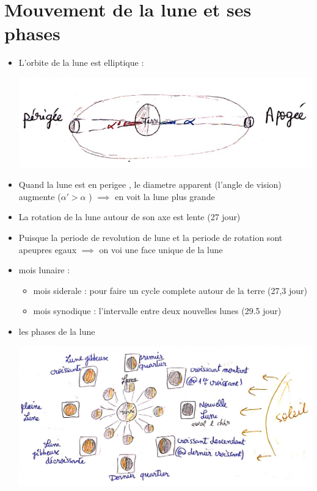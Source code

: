 \documentclass[12pt]{book}
\begin{document}
    \chapter{Mouvement de la lune et ses phases}
        \begin{itemize}
            \item L'orbite de la lune est elliptique :
                \begin{center}
                    \includegraphics[width=0.5\linewidth]{pic/mouvementlune.png}
                \end{center}
            \item Quand la lune est en perigee , le diametre apparent (l'angle de vision) augmente ($ \alpha' > \alpha $ ) $ \implies $ en voit la lune plus grande 
            \item La rotation de la lune autour de son axe est lente (27 jour) 
            \item Puisque la periode de revolution de lune et la periode de rotation sont apeupres egaux $ \implies $ on voi une face unique de la lune 
            \item mois lunaire :
                \begin{itemize}
                    \item mois siderale : pour faire un cycle complete autour de la terre (27,3 jour)
                    \item mois synodique : l'intervalle entre deux nouvelles lunes (29.5 jour)
                \end{itemize} 
            \pagebreak
            \item les phases de la lune
                \begin{center}
                    \includegraphics[width=0.8\linewidth]{pic/lunephase.png}

\end{center}
\end{itemize}
\end{document}

